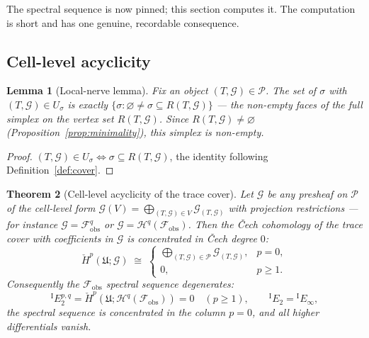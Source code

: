 \documentclass[11pt,oneside]{amsart}
\theoremstyle{plain}
\newtheorem{theorem}{Theorem}[section]
\newtheorem{lemma}[theorem]{Lemma}
\theoremstyle{definition}
\theoremstyle{remark}
\theoremstyle{honeststyle}
\newcommand{\G}{\mathcal{G}}
\newcommand{\fobs}{\mathcal{F}_{\mathrm{obs}}}
\newcommand{\Pp}{\mathcal{P}}
\newcommand{\Uf}{\mathfrak{U}}
\newcommand{\rare}{R}
\begin{document}
The spectral sequence is now pinned; this section computes it. The
computation is short and has one genuine, recordable consequence.

\subsection{Cell-level acyclicity}
\label{ssec:acyclicity}

\begin{lemma}[Local-nerve lemma]
\label{lem:localnerve}
Fix an object $(T,\G)\in\Pp$. The set of $\sigma$ with $(T,\G)\in
U_{\sigma}$ is exactly $\{\sigma:\varnothing\neq\sigma\subseteq
\rare(T,\G)\}$ --- the non-empty faces of the full simplex on the
vertex set $\rare(T,\G)$. Since $\rare(T,\G)\neq\varnothing$
(Proposition~\ref{prop:minimality}), this simplex is non-empty.
\end{lemma}

\begin{proof}
$(T,\G)\in U_{\sigma}\iff\sigma\subseteq\rare(T,\G)$, the identity
following Definition~\ref{def:cover}.
\end{proof}

\begin{theorem}[Cell-level acyclicity of the trace cover]
\label{thm:degeneration}
Let $\mathcal G$ be any presheaf on $\Pp$ of the cell-level form
$\mathcal G(V)=\bigoplus_{(T,\G)\in V}\mathcal G_{(T,\G)}$ with
projection restrictions --- for instance $\mathcal G=\fobs^{q}$ or
$\mathcal G=\mathcal H^{q}(\fobs)$. Then the \v{C}ech cohomology of
the trace cover with coefficients in $\mathcal G$ is concentrated in
\v{C}ech degree $0$:
\[
  \check H^{p}(\Uf;\mathcal G)\;\cong\;
  \begin{cases}
    \bigoplus_{(T,\G)\in\Pp}\mathcal G_{(T,\G)}, & p=0,\\[4pt]
    0, & p\ge1.
  \end{cases}
\]
Consequently the $\fobs$ spectral sequence \emph{degenerates}:
\[
  {}^{\mathrm{I}}E_{2}^{p,q}=\check H^{p}(\Uf;\mathcal H^{q}(\fobs))
  =0\quad(p\ge1),
  \qquad
  {}^{\mathrm{I}}E_{2}={}^{\mathrm{I}}E_{\infty},
\]
the spectral sequence is concentrated in the column $p=0$, and all
higher differentials vanish.
\end{theorem}
\end{document}
